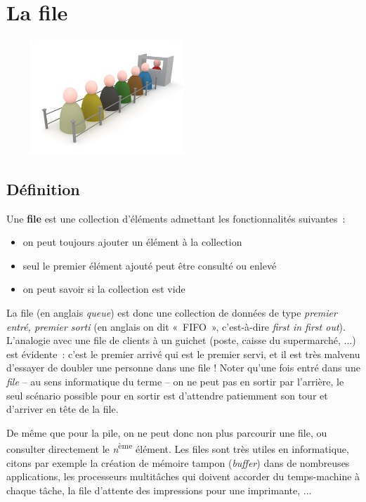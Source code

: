 \chapter{La file}

\begin{center}
	\includegraphics[width=7.553cm,height=4.357cm]{image/a2012Logique2eme-img013.jpg}
\end{center}
	

\section{Définition}
	
	Une \textbf{file} est une collection d'éléments 
	admettant les fonctionnalités suivantes~:

	\begin{itemize}
		\item {
			on peut toujours ajouter un élément à la collection}
		\item {
			seul le premier élément ajouté peut être consulté ou enlevé}
		\item {
			on peut savoir si la collection est vide}
	\end{itemize}

	La file (en anglais \textit{queue}) est donc une collection 
	de données de type \textit{premier entré, premier sorti} 
	(en anglais on dit «~FIFO~», c'est-à-dire \textit{first in first out}). 
	L'analogie avec une file de clients à un guichet (poste, caisse du 
	supermarché, ...) est évidente~: c'est le premier arrivé qui est 
	le premier servi, et il est très malvenu d'essayer de doubler une personne 
	dans une file ! Noter qu'une fois entré dans une \textit{file} -- au
	sens informatique du terme -- on ne peut pas en sortir par l'arrière, 
	le seul scénario possible pour en sortir est
	d'attendre patiemment son tour et d'arriver en tête de la file.

	De même que pour la pile, on ne peut donc non plus parcourir une 
	file, ou consulter directement le \textit{n}\textsuperscript{ème}
	élément. Les files sont très utiles en informatique, citons par 
	exemple la création de mémoire tampon (\textit{buffer})
	dans de nombreuses applications, les processeurs multitâches 
	qui doivent accorder du temps-machine à chaque tâche, la
	file d'attente des impressions pour une imprimante, ...

